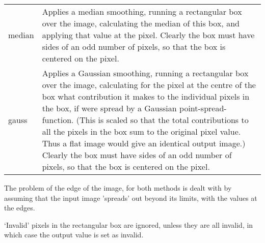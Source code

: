 \begin{small}
{{\begin{tabular}{|l|p{4.0in}|}
   median &  Applies a median smoothing, running a rectangular
           box over the image, calculating the median of this box,
           and applying that value at the pixel. Clearly the box
           must have sides of an odd number of pixels, so that the
           box is centered on the pixel. \\
 
   gauss &  Applies a Gaussian smoothing, running a rectangular
           box over the image, calculating for the pixel at the centre
           of the box what contribution it makes to the individual
           pixels in the box, if were spread by a Gaussian point-spread-
           function. (This is scaled so that the total contributions
           to all the pixels in the box sum to the original pixel
           value. Thus a flat image would give an identical output image.)
           Clearly the box must have sides of an odd number of pixels, so
           that the box is centered on the pixel. \\
\hline\end{tabular}\vspace*{2mm}
 
  The problem of the edge of the image, for both methods is dealt with
  by assuming that the input image 'spreads' out beyond its limits, with
  the values at the edges.
 
  `Invalid' pixels in the rectangular box are ignored, unless they
  are all invalid, in which case the output value is set as invalid.
 
 
}}
\end{small}
